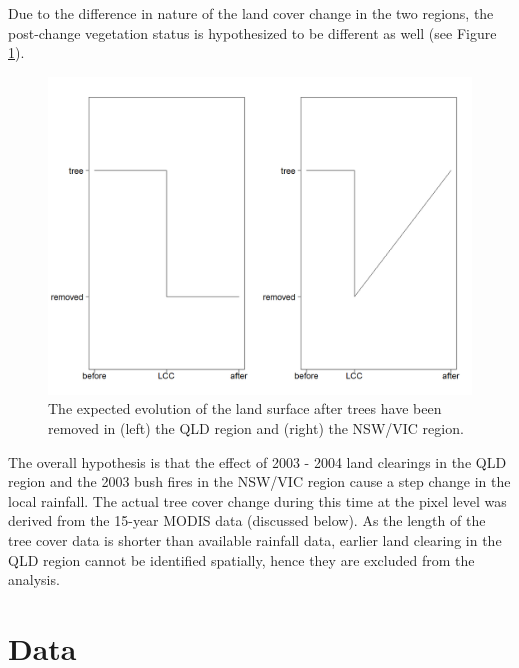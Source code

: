 \documentclass[fleqn,10pt,lineno]{wlpeerj} %
\theoremstyle{definition}
\theoremstyle{definition}
\theoremstyle{definition}
\theoremstyle{remark}
\begin{document}
Due to the difference in nature of the land cover change in the two
regions, the post-change vegetation status is hypothesized to be
different as well (see Figure \ref{fig:figure3-tc-simple}).

\begin{figure}
\includegraphics[width=0.9\linewidth]{figures/tc_simple} \caption{The expected evolution of the land surface after trees have been removed in (left) the QLD region and (right) the NSW/VIC region.}\label{fig:figure3-tc-simple}
\end{figure}

The overall hypothesis is that the effect of 2003 - 2004 land clearings
in the QLD region and the 2003 bush fires in the NSW/VIC region cause a
step change in the local rainfall. The actual tree cover change during
this time at the pixel level was derived from the 15-year MODIS data
(discussed below). As the length of the tree cover data is shorter than
available rainfall data, earlier land clearing in the QLD region cannot
be identified spatially, hence they are excluded from the analysis.

\hypertarget{Data}{\section{Data}\label{Data}}
\end{document}
